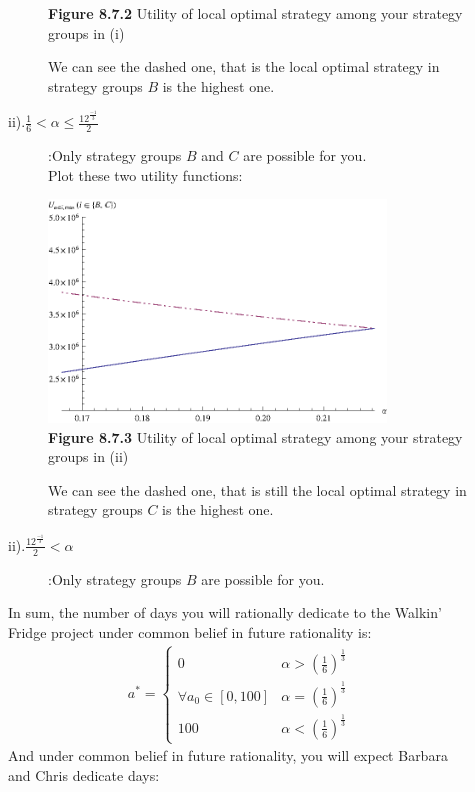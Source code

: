 \documentclass{article}
\begin{document}
\begin{description}
\begin{description}
\begin{center}
                    {\bf Figure 8.7.2} Utility of local optimal strategy among your strategy groups in (i)
        \end{center}
        We can see the dashed one, that is the local optimal strategy in strategy groups $B$ is the highest one.
      \item[ii).$\frac{1}{6}<\alpha \leq \frac{12^{\frac{-1}{3}}}{2}$]:Only strategy groups $B$ and $C$ are possible for you.\\
        Plot these two utility functions:
         \begin{center}
                    \includegraphics[angle=0, width=0.8\textwidth]{ECON3160A4P22}\\
                    {\bf Figure 8.7.3} Utility of local optimal strategy among your strategy groups in (ii)
        \end{center}
        We can see the dashed one, that is still the local optimal strategy in strategy groups $C$ is the highest one.
      \item[ii).$\frac{12^{\frac{-1}{3}}}{2}<\alpha$]:Only strategy groups $B$ are possible for you.
    \end{description}
        In sum, the number of days you will rationally dedicate to the Walkin' Fridge project under common belief in future rationality is:
        \begin{align}
          a^*=\begin{cases}
         0 & \alpha >\left(\frac{1}{6}\right)^{\frac{1}{3}} \\
         \forall a_0\in [0,100] & \alpha =\left(\frac{1}{6}\right)^{\frac{1}{3}} \\
         100 & \alpha <\left(\frac{1}{6}\right)^{\frac{1}{3}}
            \end{cases}
        \end{align}
        And under common belief in future rationality, you will expect Barbara and Chris dedicate days:

\end{description}
\end{document}

